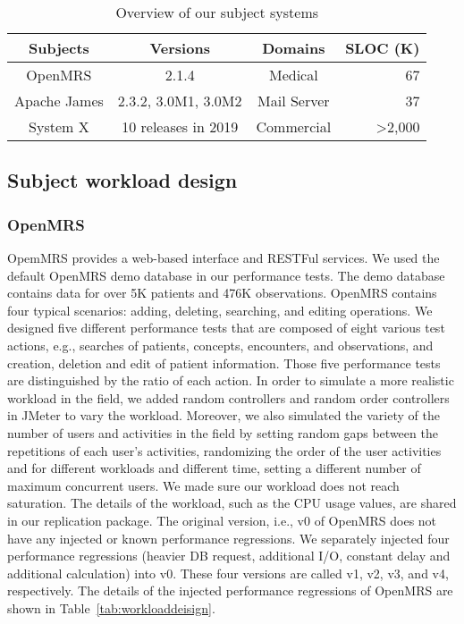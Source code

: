 \begin{table}[tbh]
  \centering
  \caption{Overview of our subject systems}
    \begin{tabular}{c|c|c|r}
    \hline
    Subjects & Versions & Domains & SLOC (K) \\
    \hline
    OpenMRS & 2.1.4 & Medical & 67 \\
    
    Apache James & 2.3.2, 3.0M1, 3.0M2 & Mail Server & 37 \\
    
    System X & 10 releases in 2019 & Commercial & \textgreater 2,000 \\
    \hline
    \end{tabular}%
  \label{tab:subjects}%
\end{table}%


\subsection{Subject workload design}
\subsubsection{OpenMRS}
OpemMRS provides a web-based interface and RESTFul services. We used the default OpenMRS demo database in our performance tests. The demo database contains data for over 5K patients and 476K observations. OpenMRS contains four typical scenarios: adding, deleting, searching, and editing operations. We designed five different performance tests that are composed of eight various test actions, e.g., searches of patients, concepts, encounters, and observations, and creation, deletion and edit of patient information. Those five performance tests are distinguished by the ratio of each action. In order to simulate a more realistic workload in the field, we added random controllers and random order controllers in JMeter to vary the workload. Moreover, we also simulated the variety of the number of users and activities in the field by setting random gaps between the repetitions of each user’s activities, randomizing the order of the user activities and for different workloads and different time, setting a different number of maximum concurrent users. We made sure our workload does not reach saturation. The details of the workload, such as the CPU usage values, are shared in our replication package. The original version, i.e., v0 of OpenMRS does not have any injected or known performance regressions. We separately injected four performance regressions (heavier DB request, additional I/O, constant delay and additional calculation) into v0. These four versions are called v1, v2, v3, and v4, respectively. The details of the injected performance regressions of OpenMRS are shown in Table~\ref{tab:workloaddeisign}.

